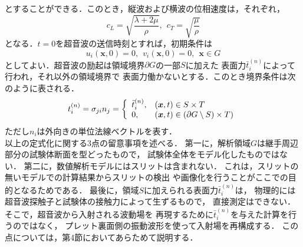 とすることができる．このとき，縦波および横波の位相速度は，それぞれ，
\begin{equation}
	c_{L}=\sqrt{\frac{\lambda + 2\mu}{\rho}}
	, \ \ 
	c_{T}=\sqrt{\frac{\mu}{\rho}}
	\label{eqn:}
\end{equation}
となる．$t=0$を超音波の送信時刻とすれば，初期条件は
\begin{equation}
	u_i(\boldsymbol{x},0)=0, \ \ v_i(\boldsymbol{x},0)=0, \ \ \boldsymbol{x} \in G
	\label{eqn:IC}
\end{equation}
としてよい．超音波の励起は領域境界$\partial G$の一部$S$に加えた
表面力$\bar{t}_i^{(n)}$によって行われ，それ以外の領域境界で
表面力働かないとする．このとき境界条件は次のように表される．
\begin{equation}
	t_i^{(n)} = \sigma_{ji}n_j=
	\left\{
		\begin{array}{ll}	
			\bar{t}^{(n)}_i, & (\boldsymbol{x},t)\in S\times T \\
			0,  & (\boldsymbol{x},t)\in (\partial G \setminus S)\times T) 
		\end{array}
	\right.
	\label{eqn:BC}
\end{equation}
ただし$n_i$は外向きの単位法線ベクトルを表す．
\\
\hspace{\parindent}
以上の定式化に関する3点の留意事項を述べる．
第一に，解析領域$G$は継手周辺部分の試験体断面を型どったもので，
試験体全体をモデル化したものではない．
第二に，数値解析モデルにはスリットは含まれない．
これは，スリットの無いモデルでの計算結果からスリットの検出
や画像化を行うことがここでの目的となるためである．
最後に，領域$S$に加えられる表面力$\bar{t}_i^{(n)}$は，
物理的には超音波探触子と試験体の接触力によって生ずるもので，
直接測定はできない．そこで，超音波から入射される波動場を
再現するために$\bar{t}^{(n)}_i$を与えた計算を行うのではなく，
プレット裏面側の振動波形を使って入射場を再構成する．
この点については，第4節においてあらためて説明する．
